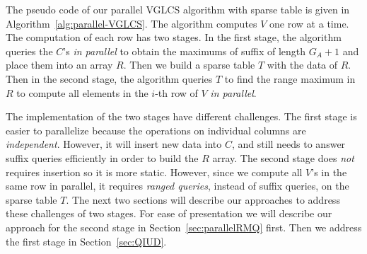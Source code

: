The pseudo code of our parallel VGLCS algorithm with sparse table is
given in Algorithm~\ref{alg:parallel-VGLCS}.  The algorithm computes
$V$ one row at a time.  The computation of each row has two stages.
In the first stage, the algorithm queries the $C$'s {\em in parallel}
to obtain the maximums of suffix of length $G_A + 1$ and place them
into an array $R$.  Then we build a sparse table $T$ with the data of
$R$.  Then in the second stage, the algorithm queries $T$ to find the
range maximum in $R$ to compute all elements in the $i$-th row of $V$
{\em in parallel}.



The implementation of the two stages have different challenges.  The
first stage is easier to parallelize because the operations on
individual columns are {\em independent}.  However, it will insert new
data into $C$, and still needs to answer suffix queries efficiently in
order to build the $R$ array.  The second stage does {\em not}
requires insertion so it is more static.  However, since we compute
all $V$'s in the same row in parallel, it requires {\em ranged
  queries}, instead of suffix queries, on the sparse table $T$.  The
next two sections will describe our approaches to address these
challenges of two stages.  For ease of presentation we will describe
our approach for the second stage in Section~\ref{sec:parallelRMQ}
first.  Then we address the first stage in Section~\ref{sec:QIUD}.

